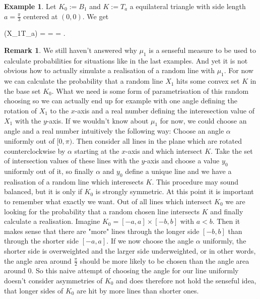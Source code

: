 \documentclass[12pt,a4paper]{scrartcl}
\numberwithin{equation}{subsection}
\newcommand{\PP}{\mathbb{P}} %
\numberwithin{equation}{section}
\theoremstyle{definition}
\newtheorem{example}{Example}[subsection]
\newtheorem{remark}{Remark}[subsection]
\begin{document}
\begin{example}
	Let $K_0 := B_1$ and $K:=T_a$ a equilateral triangle with side length $a=\frac{\pi}{3}$ centered at $(0,0)$. We get 
	\begin{flalign*}
	\PP(X_1\cap T_a\neq\emptyset) =  =  = .
	\end{flalign*}
\end{example}



\begin{remark}
	We still haven't answered why $\mu_1$ is a senseful measure to be used to calculate probabilities for situations like in the last examples. And yet it is not obvious how to actually simulate a realisation of a random line with $\mu_1$. For now we can calculate the probability that a random line $X_1$ hits some convex set $K$ in the base set $K_0$. What we need is some form of parametrisation of this random choosing so we can actually end up for example with one angle defining the rotation of $X_1$ to the $x$-axis and a real number defining the interesection value of $X_1$ with the $y$-axis. If we wouldn't know about $\mu_1$ for now, we could choose an angle and a real number intuitively the following way: Choose an angle $\alpha$ uniformly out of $[0,\pi)$. Then consider all lines in the plane which are rotated counterclockwise by $\alpha$ starting at the $x$-axis and which intersect $K$. Take the set of intersection values of these lines with the $y$-axis and choose a value $y_0$ uniformly out of it, so finally $\alpha$ and $y_0$ define a unique line and we have a realisation of a random line which interesects $K$. This procedure may sound balanced, but it is only if $K_0$ is strongly symmetric. At this point it is important to remember what exactly we want. Out of all lines which intersect $K_0$ we are looking for the probability that a random chosen line intersects $K$ and finally calculate a realisation. Imagine $K_0=[-a,a]\times [-b,b]$ with $a<b$. Then it makes sense that there are "more" lines through the longer side $[-b,b]$ than through the shorter side $[-a,a]$. If we now choose the angle $\alpha$ uniformly, the shorter side is overweighted and the larger side underweighted, or in other words, the angle area around $\frac{\pi}{2}$ should be more likely to be chosen than the angle area around $0$. So this naive attempt of choosing the angle for our line uniformly doesn't consider asymmetries of $K_0$ and does therefore not hold the senseful idea, that longer sides of $K_0$ are hit by more lines than shorter ones. 
\end{remark}
\end{document}
